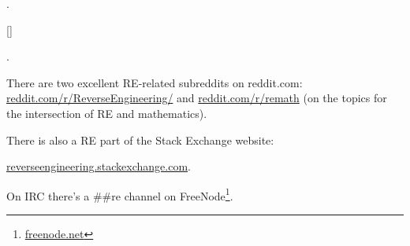 
\JavaBook.


[\TAOUP]





\HenryWarren.

There are two excellent \ac{RE}-related subreddits on reddit.com:
\href{http://go.yurichev.com/17027}{reddit.com/r/ReverseEngineering/} and
\href{http://go.yurichev.com/17028}{reddit.com/r/remath}
(on the topics for the intersection of \ac{RE} and mathematics).

There is also a \ac{RE} part of the Stack Exchange website:

\par \href{http://go.yurichev.com/17029}{reverseengineering.stackexchange.com}.

On IRC there's a \#\#re channel on
FreeNode\footnote{\href{http://go.yurichev.com/17030}{freenode.net}}.

